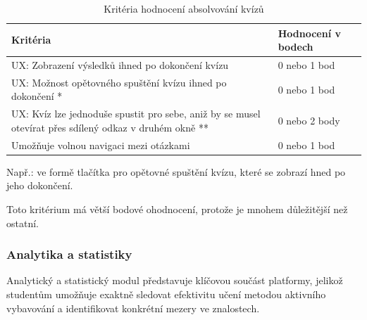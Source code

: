 \documentclass{vskpou} %
\begin{document}
\begin{table}[H]
\caption{Kritéria hodnocení absolvování kvízů}
\label{tab:absolvovani}
\centering
\begin{threeparttable}
\begin{tabular}{|p{}|l|}
\hline
\textbf{Kritéria} & \textbf{Hodnocení v bodech} \\ \hline
UX: Zobrazení výsledků ihned po dokončení kvízu & 0 nebo 1 bod \\ \hline
UX: Možnost opětovného spuštění kvízu ihned po dokončení * & 0 nebo 1 bod \\ \hline
UX: Kvíz lze jednoduše spustit pro sebe, aniž by se musel otevírat přes sdílený odkaz v druhém okně ** & 0 nebo 2 body \\ \hline
Umožňuje volnou navigaci mezi otázkami & 0 nebo 1 bod \\ \hline
\end{tabular}
\begin{tablenotes}[flushleft]
\footnotesize
\item[*] Např.: ve formě tlačítka pro opětovné spuštění kvízu, které se zobrazí hned po jeho dokončení.
\item[**] Toto kritérium má větší bodové ohodnocení, protože je mnohem důležitější než ostatní.
\end{tablenotes}
\end{threeparttable}
\end{table}

\subsubsection{Analytika a statistiky}

Analytický a statistický modul představuje klíčovou součást platformy, jelikož studentům umožňuje exaktně sledovat efektivitu učení metodou aktivního vybavování a identifikovat konkrétní mezery ve znalostech.
\end{document}
